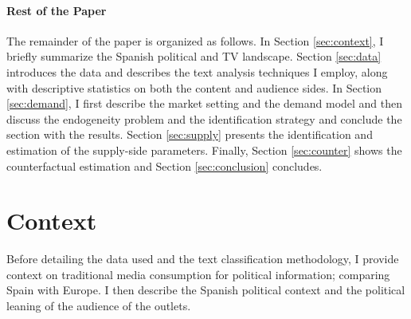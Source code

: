\documentclass[12pt]{article}
\begin{document}

\paragraph{Rest of the Paper}

The remainder of the paper is organized as follows. In Section \ref{sec:context}, I briefly summarize the Spanish political and TV landscape. Section \ref{sec:data} introduces the data and describes the text analysis techniques I employ, along with descriptive statistics on both the content and audience sides. In Section \ref{sec:demand}, I first describe the market setting and the demand model and then discuss the endogeneity problem and the identification strategy and  conclude the section with the results.  Section \ref{sec:supply} presents the identification and estimation of the supply-side parameters. Finally, Section \ref{sec:counter} shows the counterfactual estimation and Section \ref{sec:conclusion} concludes. 

	
	
	\section{Context}
	
	Before detailing the data used and the text classification methodology, I provide context on traditional media consumption for political information; comparing Spain with Europe. I then describe the Spanish political context and the political leaning of the audience of the outlets.
	
\end{document}
